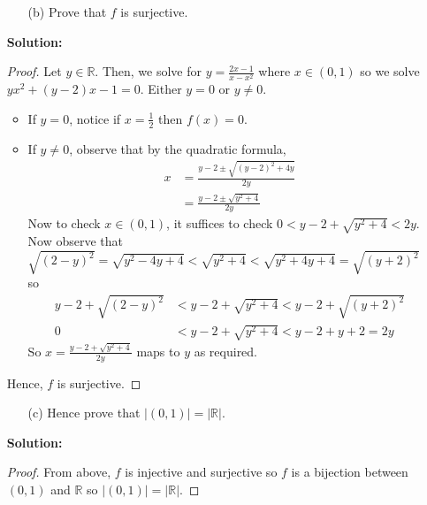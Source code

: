\documentclass[letterpaper,12pt]{article}
\theoremstyle{definition}
\begin{document}
\begin{enumerate}
    \item[] \begin{enumerate}
        \item[(b)] Prove that $f$ is surjective.
    \end{enumerate}
          \begin{mdframed}
            \textbf{Solution:}
            \begin{proof}
             Let $y \in \mathbb{R}$. Then, we solve for $y = \frac{2x-1}{x-x^2}$ where $x \in (0,1)$ so we solve $yx^2+(y-2)x-1=0$. Either $y = 0$ or $y\neq 0$. \begin{itemize}
                 \item If $y=0$, notice if $x= \frac{1}{2}$ then $f(x) = 0$.
                 \item If $y\neq 0$, observe that by the quadratic formula, \begin{align*}
                     x &= \frac{y-2 \pm \sqrt{(y-2)^2 + 4y}}{2y} \\
                     &= \frac{y-2 \pm \sqrt{y^2 + 4}}{2y}
                 \end{align*}
                 Now to check $x \in (0,1)$, it suffices to check $0 < y-2 + \sqrt{y^2 + 4} < 2y$. Now observe that $\sqrt{(2-y)^2} =\sqrt{y^2 - 4y + 4} < \sqrt{y^2+4} < \sqrt{y^2 + 4y + 4} = \sqrt{(y+2)^2}$ so \begin{align*}
                     y-2 + \sqrt{(2-y)^2}&< y-2 + \sqrt{y^2 + 4} < y-2 + \sqrt{(y+2)^2} \\
                     0 &< y-2  + \sqrt{y^2 + 4} < y-2 + y + 2 = 2y
                 \end{align*} 
                 So $x = \frac{y-2 + \sqrt{y^2 + 4}}{2y}$ maps to $y$ as required.
             \end{itemize}
             Hence, $f$ is surjective.
             \end{proof}
        \end{mdframed}
        \vspace{1in}
    \begin{enumerate}
        \item[(c)] Hence prove that $|(0,1)|=|\mathbb{R}|$.
    \end{enumerate}
         \begin{mdframed}
            \textbf{Solution:}
            \begin{proof}
             From above, $f$ is injective and surjective so $f$ is a bijection between $(0,1)$ and $\mathbb{R}$ so $|(0,1)|=|\mathbb{R}|$.
             \end{proof}
        \end{mdframed}   
\end{enumerate}
\end{document}
